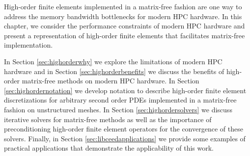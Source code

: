 High-order finite elements implemented in a matrix-free fashion are one way to address the memory bandwidth bottlenecks for modern HPC hardware.
In this chapter, we consider the performance constraints of modern HPC hardware and present a representation of high-order finite elements that facilitates matrix-free implementation.

In Section \ref{sec:highorderwhy} we explore the limitations of modern HPC hardware and in Section \ref{sec:highorderbenefits} we discuss the benefits of high-order matrix-free methods on modern HPC hardware.
In Section \ref{sec:highordernotation} we develop notation to describe high-order finite element discretizations for arbitrary second order PDEs implemented in a matrix-free fashion on unstructured meshes.
In Section \ref{sec:highordersolvers} we discuss iterative solvers for matrix-free methods as well as the importance of preconditioning high-order finite element operators for the convergence of these solvers.
Finally, in Section \ref{sec:libceedapplications} we provide some examples of practical applications that demonstrate the applicability of this work.
